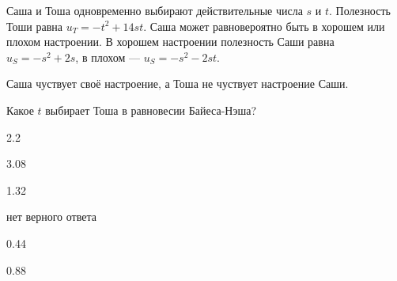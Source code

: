 
\begin{question}
Саша и Тоша одновременно выбирают действительные числа \(s\) и \(t\).
Полезность Тоши равна \(u_T = -t^2 + 14st\). Саша может равновероятно
быть в хорошем или плохом настроении. В хорошем настроении полезность
Саши равна \(u_S = -s^2 + 2s\), в плохом --- \(u_S = -s^2 - 2st\).

Саша чуствует своё настроение, а Тоша не чуствует настроение Саши.

Какое \(t\) выбирает Тоша в равновесии Байеса-Нэша?
\begin{answerlist}
  \item 2.2
  \item 3.08
  \item 1.32
  \item нет верного ответа
  \item 0.44
  \item 0.88
\end{answerlist}
\end{question}


